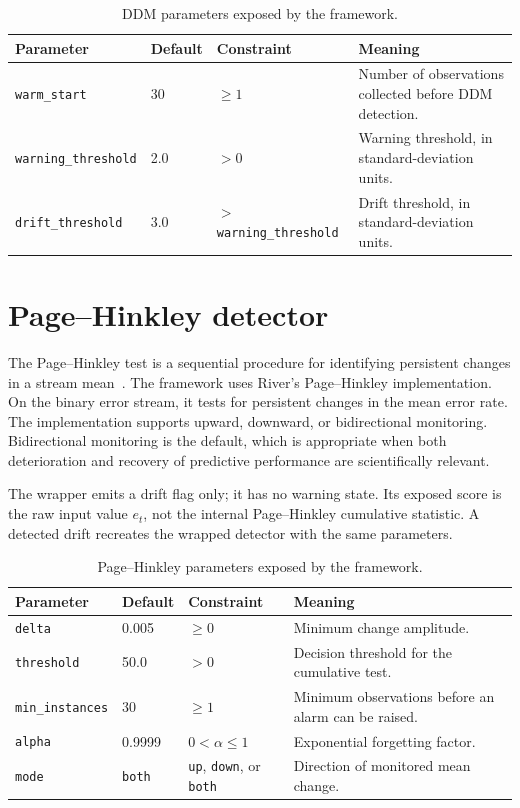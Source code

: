 \begin{table}[htbp]
\centering
\caption{DDM parameters exposed by the framework.}
\label{tab:ddm-parameters}
\begin{tabular}{@{}lllp{5.7cm}@{}}
\toprule
Parameter & Default & Constraint & Meaning \\
\midrule
\texttt{warm\_start} & 30 & $\geq1$ & Number of observations collected before DDM detection. \\
\texttt{warning\_threshold} & 2.0 & $>0$ & Warning threshold, in standard-deviation units. \\
\texttt{drift\_threshold} & 3.0 & $>$ \texttt{warning\_threshold} & Drift threshold, in standard-deviation units. \\
\bottomrule
\end{tabular}
\end{table}

\section{Page--Hinkley detector}
\label{sec:page-hinkley}

The Page--Hinkley test is a sequential procedure for identifying persistent changes in a stream mean~\cite{page1954continuous}. The framework uses River's Page--Hinkley implementation. On the binary error stream, it tests for persistent changes in the mean error rate. The implementation supports upward, downward, or bidirectional monitoring. Bidirectional monitoring is the default, which is appropriate when both deterioration and recovery of predictive performance are scientifically relevant.

The wrapper emits a drift flag only; it has no warning state. Its exposed score is the raw input value $e_t$, not the internal Page--Hinkley cumulative statistic. A detected drift recreates the wrapped detector with the same parameters.

\begin{table}[htbp]
\centering
\caption{Page--Hinkley parameters exposed by the framework.}
\label{tab:ph-parameters}
\begin{tabular}{@{}lllp{5.7cm}@{}}
\toprule
Parameter & Default & Constraint & Meaning \\
\midrule
\texttt{delta} & 0.005 & $\geq0$ & Minimum change amplitude. \\
\texttt{threshold} & 50.0 & $>0$ & Decision threshold for the cumulative test. \\
\texttt{min\_instances} & 30 & $\geq1$ & Minimum observations before an alarm can be raised. \\
\texttt{alpha} & 0.9999 & $0<\alpha\leq1$ & Exponential forgetting factor. \\
\texttt{mode} & \texttt{both} & \texttt{up}, \texttt{down}, or \texttt{both} & Direction of monitored mean change. \\
\bottomrule
\end{tabular}
\end{table}

